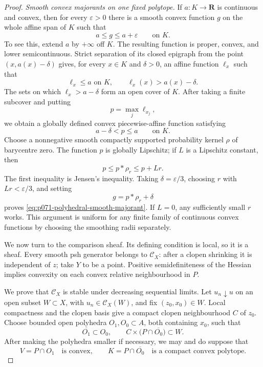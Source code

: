 \begin{proof}
\medskip\noindent\emph{Smooth convex majorants on one fixed polytope.}
If \(a:K\to\mathbf R\) is continuous and convex, then for every
\(\varepsilon>0\) there is a smooth convex function \(g\) on the whole
affine span of \(K\) such that
\begin{equation}
                       a\leq g\leq a+\varepsilon
                       \qquad\text{on }K.
 \label{eq:p071-polyhedral-smooth-majorant}
\end{equation}
To see this, extend \(a\) by \(+\infty\) off \(K\).  The resulting function
is proper, convex, and lower semicontinuous.  Strict separation of its
closed epigraph from the point \((x,a(x)-\delta)\) gives, for every
\(x\in K\) and \(\delta>0\), an affine function \(\ell_x\) such that
\[
                         \ell_x\leq a\text{ on }K,
              \qquad     \ell_x(x)>a(x)-\delta .
\]
The sets on which \(\ell_x>a-\delta\) form an open cover of \(K\).
After taking a finite subcover and putting
\[
                              p=\max_j\ell_{x_j},
\]
we obtain a globally defined convex piecewise-affine function satisfying
\[
                              a-\delta<p\leq a
                              \qquad\text{on }K.
\]
Choose a nonnegative smooth compactly supported probability kernel
\(\rho\) of barycentre zero.  The function \(p\) is globally Lipschitz;
if \(L\) is a Lipschitz constant, then
\[
                  p\leq p*\rho_r\leq p+Lr .
\]
The first inequality is Jensen's inequality.  Taking
\(\delta=\varepsilon/3\), choosing \(r\) with
\(Lr<\varepsilon/3\), and setting
\[
                              g=p*\rho_r+\delta
\]
proves \eqref{eq:p071-polyhedral-smooth-majorant}.  If \(L=0\), any
sufficiently small \(r\) works.  This argument is uniform for any finite
family of continuous convex functions by choosing the smoothing radii
separately.

\medskip\noindent
We now turn to the comparison sheaf.  Its defining condition is local, so
it is a sheaf.  Every smooth psh generator belongs to
\(\mathscr C_X\): after a clopen shrinking it is independent of \(z\);
take \(Y\) to be a point.  Positive semidefiniteness of the Hessian implies
convexity on each convex relative neighbourhood in \(P\).

We prove that \(\mathscr C_X\) is stable under decreasing sequential
limits.  Let \(u_n\downarrow u\) on an open subset \(W\subset X\), with
\(u_n\in\mathscr C_X(W)\), and fix \((z_0,x_0)\in W\).  Local compactness
and the clopen basis give a compact clopen neighbourhood \(C\) of \(z_0\).
Choose bounded open polyhedra \(O_1,O_0\subset A\), both containing
\(x_0\), such that
\[
 \overline{O_1}\subset O_0,\qquad
 C\times\bigl(P\cap\overline{O_0}\bigr)\subset W.
\]
After making the polyhedra smaller if necessary, we may and do suppose that
\[
       V=P\cap O_1\quad\text{is convex},\qquad
       K=P\cap\overline{O_0}\quad\text{is a compact convex polytope}.
 \label{eq:p071-polyhedral-compact-core}
\]


\end{proof}

